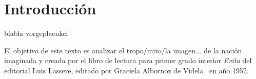 \section{Introducción}
blabla vorgeplaenkel

El objetivo de este texto es analizar el tropo/mito/la imagen... de la nación imaginada y creada por el libro de lectura para primer grado interior \textit{Evita} del editorial Luis Lassere, editado por Graciela Albornoz de Videla~\cite{Albornoz1952} en año 1952.

